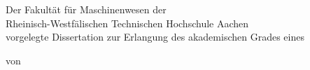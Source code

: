 
\pagestyle{empty}

\begin{center}
	
	
	\vspace{3cm}
	
	\LARGE \disstitleDE
	
	\vspace{2cm}
	
	\LARGE \disstitleEN
	
	\large
	
	\vspace{4cm}
	
	Der Fakultät für Maschinenwesen der \\
	Rheinisch-Westfälischen Technischen Hochschule Aachen \\
    vorgelegte Dissertation zur Erlangung des akademischen Grades eines \\
	
	\vspace{1cm}
	
	von
	
	\vspace{1cm}
	
	\dissauthor \\
	
	
	
\end{center}

\cleardoublepage

\pagestyle{scrheadings}